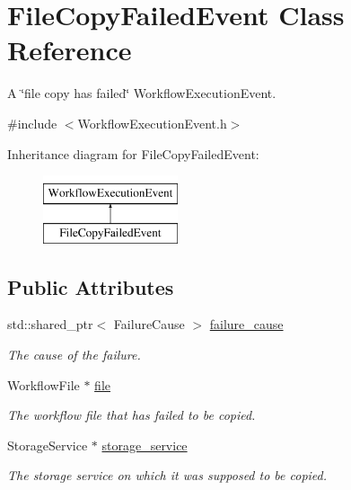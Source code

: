 \hypertarget{class_file_copy_failed_event}{}\section{File\+Copy\+Failed\+Event Class Reference}
\label{class_file_copy_failed_event}


A \char`\"{}file copy has failed\char`\"{} Workflow\+Execution\+Event.  




{\ttfamily \#include $<$Workflow\+Execution\+Event.\+h$>$}

Inheritance diagram for File\+Copy\+Failed\+Event\+:\begin{figure}[H]
\begin{center}
\leavevmode
\includegraphics[height=2.000000cm]{class_file_copy_failed_event}
\end{center}
\end{figure}
\subsection*{Public Attributes}
\begin{DoxyCompactItemize}
\item 
\mbox{\label{class_file_copy_failed_event_af73f972f9612135b0d2cbea40eb3e86c}} 
std\+::shared\+\_\+ptr$<$ Failure\+Cause $>$ \hyperlink{class_file_copy_failed_event_af73f972f9612135b0d2cbea40eb3e86c}{failure\+\_\+cause}
\begin{DoxyCompactList}\small\item\em The cause of the failure. \end{DoxyCompactList}\item 
\mbox{\label{class_file_copy_failed_event_a2bbe77ec9df5431bfa2ef2d20423aa7d}} 
Workflow\+File $\ast$ \hyperlink{class_file_copy_failed_event_a2bbe77ec9df5431bfa2ef2d20423aa7d}{file}
\begin{DoxyCompactList}\small\item\em The workflow file that has failed to be copied. \end{DoxyCompactList}\item 
\mbox{\label{class_file_copy_failed_event_a544ef5642a53ab8bab950a713d0f0846}} 
Storage\+Service $\ast$ \hyperlink{class_file_copy_failed_event_a544ef5642a53ab8bab950a713d0f0846}{storage\+\_\+service}
\begin{DoxyCompactList}\small\item\em The storage service on which it was supposed to be copied. \end{DoxyCompactList}\end{DoxyCompactItemize}



